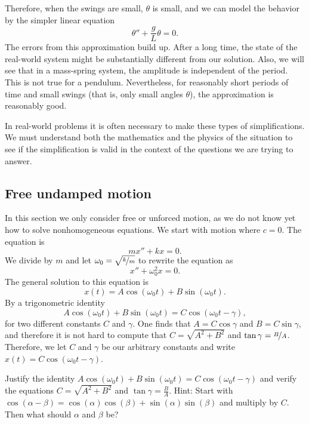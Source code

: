 Therefore, when the swings are small, $\theta$ is small, and we can
model the behavior by the simpler linear equation
\begin{equation*}
\theta'' + \frac{g}{L} \theta = 0 .
\end{equation*}
The errors from this approximation build up.
After a
long time, the state of the real-world system might be substantially
different from our solution.  Also, we will
see that in a mass-spring system, the amplitude is independent of the
period.
This is not true for a pendulum.  Nevertheless, for reasonably short periods of time
and small swings (that is, only small angles $\theta$),
the approximation is reasonably good.

In real-world problems it is often necessary to make these types of
simplifications.  We must understand both the mathematics and
the physics of the situation to see if the simplification is valid in the
context of the questions we are trying to answer.

\subsection{Free undamped motion}

In this section we only consider free or unforced motion,
as we do not know yet how to solve nonhomogeneous equations.
We start with
 motion where $c=0$.  The equation is
\begin{equation*}
mx'' + kx = 0 .
\end{equation*}
We divide by $m$ and let $\omega_0 = \sqrt{\nicefrac{k}{m}}$ to rewrite the equation as
\begin{equation*}
x'' + \omega_0^2 x = 0 .
\end{equation*}
The general solution to this equation is
\begin{equation*}
x(t) = A \cos (\omega_0 t) + B \sin (\omega_0 t) .
\end{equation*}
By a trigonometric identity
\begin{equation*}
A \cos (\omega_0 t) + B \sin (\omega_0 t) =
C \cos ( \omega_0 t - \gamma ) ,
\end{equation*}
for two different constants $C$ and $\gamma$.
One finds that $A = C \cos \gamma$ and $B = C \sin \gamma$,
and therefore
it is not hard to compute that $C= \sqrt{A^2 + B^2}$ and $\tan \gamma =
\nicefrac{B}{A}$.
Therefore, we let
$C$ and $\gamma$ be our arbitrary constants and write
$x(t) = C \cos ( \omega_0 t - \gamma )$.

\begin{exercise}
Justify the identity $A \cos (\omega_0 t) + B \sin (\omega_0 t) =
C \cos ( \omega_0 t - \gamma )$ and verify the equations $C = \sqrt{A^2+B^2}$
and $\tan \gamma = \frac{B}{A}$.  Hint: Start with
$\cos (\alpha-\beta) = \cos (\alpha) \cos
(\beta) + \sin (\alpha)\sin (\beta)$ and multiply by $C$.  Then what should
$\alpha$ and $\beta$ be?
\end{exercise}

